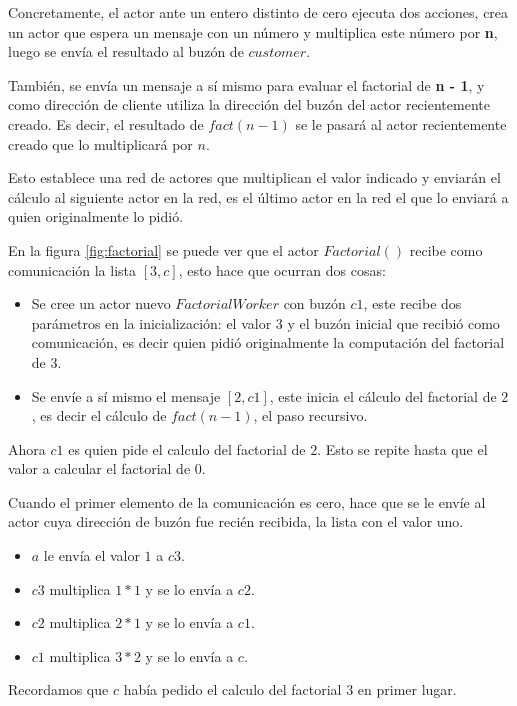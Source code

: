 Concretamente, el actor ante un entero distinto de cero ejecuta dos acciones, crea un actor que espera un mensaje con un número y multiplica este número por \textbf{n}, luego se envía el resultado al buzón de $customer$.

También, se envía un mensaje a sí mismo para evaluar el factorial de \textbf{n - 1}, y como dirección de cliente utiliza la dirección del buzón del actor recientemente creado. Es decir, el resultado de $fact(n - 1)$ se le pasará al actor recientemente creado que lo multiplicará por $n$.

Esto establece una red de actores que multiplican el valor indicado y enviarán el cálculo al siguiente actor en la red, es el último actor en la red el que lo enviará a quien originalmente lo pidió.

En la figura \ref{fig:factorial} se puede ver que el actor $Factorial()$ recibe como comunicación la lista $[3,c]$, esto hace que ocurran dos cosas:

\begin{itemize}
\item Se cree un actor nuevo $FactorialWorker$ con buzón $c1$, este recibe dos parámetros en la inicialización: el valor $3$ y el buzón inicial que recibió como comunicación, es decir quien pidió originalmente la computación del factorial de $3$.

\item Se envíe a sí mismo el mensaje $[2,c1]$, este inicia el cálculo del factorial de $2$, es decir el cálculo de $fact(n-1)$, el paso recursivo.
\end{itemize}

Ahora $c1$ es quien pide el calculo del factorial de $2$. Esto se repite hasta que el valor a calcular el factorial de $0$.

Cuando el primer elemento de la comunicación es cero, hace que se le envíe al actor cuya dirección de buzón fue recién recibida, la lista con el valor uno. 

\begin{itemize}
\item $a$ le envía el valor $1$ a $c3$.
\item $c3$ multiplica $1*1$ y se lo envía a $c2$.
\item $c2$ multiplica $2*1$ y se lo envía a $c1$.
\item $c1$ multiplica $3*2$ y se lo envía a $c$.
\end{itemize}

Recordamos que $c$ había pedido el calculo del factorial $3$ en primer lugar.

